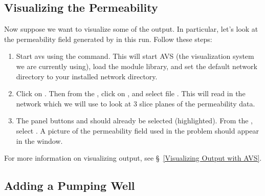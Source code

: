 \subsection*{Visualizing the Permeability}

Now suppose we want to visualize some of the output.
In particular, let's look at the permeability field generated
by \parflow{} in this run.
Follow these steps:
\begin{enumerate}

\item
Start avs using the  command.
This will start AVS (the visualization system we are currently
using), load the \parflow{} module library, and set the default
network directory to your installed \parflow{} network directory.

\item
Click on .
Then from the , click on ,
and select file .
This will read in the  network which we will
use to look at 3 slice planes of the permeability data.

\item
The panel buttons  and 
should already be selected (highlighted).
From the , select .
A picture of the permeability field used in the problem should
appear in the  window.

\end{enumerate}
For more information on visualizing \parflow{} output,
see \S~\ref{Visualizing Output with AVS}.

\subsection*{Adding a Pumping Well}

